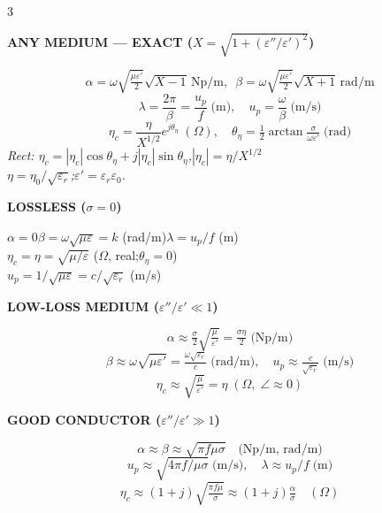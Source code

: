 \documentclass[6pt,letterpaper]{article}
\newcommand{\shead}[3]{%
  \noindent\colorbox{#1}{\parbox{\dimexpr\linewidth-2\fboxsep\relax}%
  {\color{#2}\bfseries\fontsize{6}{7}\selectfont #3}}\vspace{0.5pt}}
\begin{document}
\begin{multicols}{3}
\vspace{0.3pt}
\shead{coralbg}{coral}{ANY MEDIUM --- EXACT ($X=\sqrt{1+(\varepsilon''/\varepsilon')^2}$)}
\begin{ebox}
\[\alpha=\omega\sqrt{\tfrac{\mu\varepsilon'}{2}}\sqrt{X\!-\!1}\,\text{Np/m},\enspace\beta=\omega\sqrt{\tfrac{\mu\varepsilon'}{2}}\sqrt{X\!+\!1}\,\text{rad/m}\]
\[\lambda=\frac{2\pi}{\beta}=\frac{u_p}{f}\;\text{(m)},\quad u_p=\frac{\omega}{\beta}\;\text{(m/s)}\]
\[\eta_c=\frac{\eta}{X^{1/2}}e^{j\theta_\eta}\;(\Omega),\quad\theta_\eta=\tfrac{1}{2}\arctan\!\tfrac{\sigma}{\omega\varepsilon'}\;\text{(rad)}\]
\textit{Rect: $\eta_c=|\eta_c|\cos\theta_\eta+j|\eta_c|\sin\theta_\eta$,\enspace$|\eta_c|=\eta/X^{1/2}$}\\
\textit{$\eta=\eta_0/\sqrt{\varepsilon_r}$;\enspace$\varepsilon'=\varepsilon_r\varepsilon_0$.}
\end{ebox}

\vspace{0.3pt}
\shead{purplebg}{purple}{LOSSLESS ($\sigma=0$)}
\begin{ebox}
$\alpha=0$\quad$\beta=\omega\sqrt{\mu\varepsilon}=k$ (rad/m)\quad$\lambda=u_p/f$ (m)\\
$\eta_c=\eta=\sqrt{\mu/\varepsilon}$ ($\Omega$, real;\enspace$\theta_\eta=0$)\\
$u_p=1/\sqrt{\mu\varepsilon}=c/\sqrt{\varepsilon_r}$ (m/s)
\end{ebox}

\vspace{0.3pt}
\shead{coralbg}{coral}{LOW-LOSS MEDIUM ($\varepsilon''/\varepsilon'\ll 1$)}
\begin{ebox}
\[\alpha\approx\tfrac{\sigma}{2}\sqrt{\tfrac{\mu}{\varepsilon'}}=\tfrac{\sigma\eta}{2}\;\text{(Np/m)}\]
\[\beta\approx\omega\sqrt{\mu\varepsilon'}=\tfrac{\omega\sqrt{\varepsilon_r}}{c}\;\text{(rad/m)},\quad u_p\approx\tfrac{c}{\sqrt{\varepsilon_r}}\;\text{(m/s)}\]
\[\eta_c\approx\sqrt{\tfrac{\mu}{\varepsilon'}}=\eta\;(\Omega,\;\angle\approx0)\]
\end{ebox}

\vspace{0.3pt}
\shead{coralbg}{coral}{GOOD CONDUCTOR ($\varepsilon''/\varepsilon'\gg 1$)}
\begin{ebox}
\[\alpha\approx\beta\approx\sqrt{\pi f\mu\sigma}\quad\text{(Np/m, rad/m)}\]
\[u_p\approx\sqrt{4\pi f/\mu\sigma}\;\text{(m/s)},\quad\lambda\approx u_p/f\;\text{(m)}\]
\[\eta_c\approx(1+j)\sqrt{\tfrac{\pi f\mu}{\sigma}}\approx(1+j)\tfrac{\alpha}{\sigma}\quad(\Omega)\]
\end{ebox}


\end{multicols}
\end{document}
